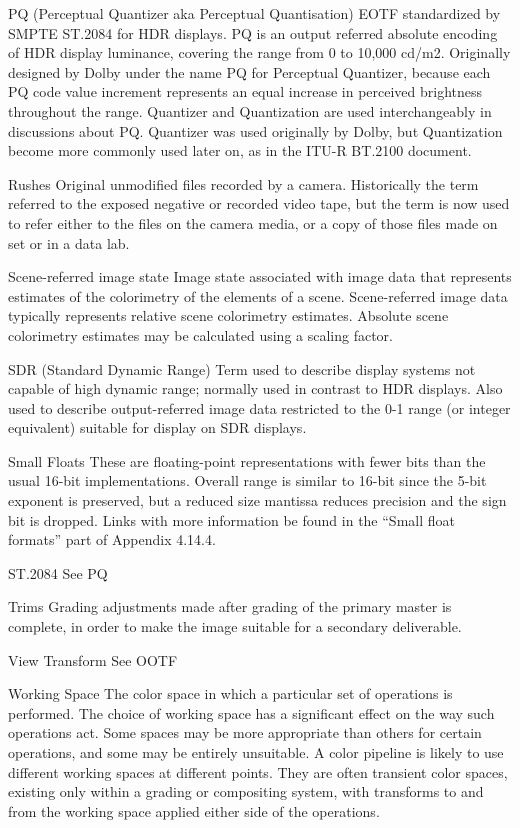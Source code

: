 PQ (Perceptual Quantizer aka Perceptual Quantisation)
EOTF standardized by SMPTE ST.2084 for HDR displays. PQ is an output referred absolute encoding of HDR display luminance, covering the range from 0 to 10,000 cd/m2. Originally designed by Dolby under the name PQ for Perceptual Quantizer, because each PQ code value increment represents an equal increase in perceived brightness throughout the range. Quantizer and Quantization are used interchangeably in discussions about PQ. Quantizer was used originally by Dolby, but Quantization become more commonly used later on, as in the ITU-R BT.2100 document.

Rushes
Original unmodified files recorded by a camera. Historically the term referred to the exposed negative or recorded video tape, but the term is now used to refer either to the files on the camera media, or a copy of those files made on set or in a data lab.

Scene-referred image state
Image state associated with image data that represents estimates of the colorimetry of the elements of a scene. Scene-referred image data typically represents relative scene colorimetry estimates. Absolute scene colorimetry estimates may be calculated using a scaling factor.

SDR (Standard Dynamic Range)
Term used to describe display systems not capable of high dynamic range; normally used in contrast to HDR displays. Also used to describe output-referred image data restricted to the 0-1 range (or integer equivalent) suitable for display on SDR displays.

Small Floats
These are floating-point representations with fewer bits than the usual 16-bit implementations. Overall range is similar to 16-bit since the 5-bit exponent is preserved, but a reduced size mantissa reduces precision and the sign bit is dropped. Links with more information be found in the “Small float formats” part of Appendix 4.14.4.

ST.2084
See PQ

Trims
Grading adjustments made after grading of the primary master is complete, in order to make the image suitable for a secondary deliverable.

View Transform 
See OOTF

Working Space
The color space in which a particular set of operations is performed. The choice of working space has a significant effect on the way such operations act. Some spaces may be more appropriate than others for certain operations, and some may be entirely unsuitable. A color pipeline is likely to use different working spaces at different points. They are often transient color spaces, existing only within a grading or compositing system, with transforms to and from the working space applied either side of the operations.

